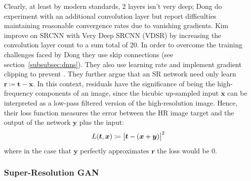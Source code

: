 Clearly, at least by modern standards, 2 layers isn't very deep; Dong \etal do experiment with an additional convolution layer but report difficulties maintaining reasonable convergence rates due to vanishing gradients.
%
Kim \etal \cite{Kim_2016} improve on SRCNN with Very Deep SRCNN (VDSR) by increasing the convolution layer count to a sum total of 20.
%
In order to overcome the training challenges faced by Dong \etal they use skip connections (see section~\ref{subsubsec:dnns}).
%
They also use learning rate  and implement gradient clipping to prevent .
%
They further argue that an SR network need only learn  \(\bm{r} \coloneqq \bm{t} - \bm{x}\).
%
In this context, residuals have the significance of being the high-frequency components of an image, since the bicubic up-sampled input \(\bm{x}\) can be interpreted as a low-pass filtered version of the high-resolution image.
%
Hence, their loss function measures the error between the HR image target and the output of the network \(\bm{y}\) plus the input:
\begin{equation}
    L(\bm{t}, \bm{x}) \coloneqq \abs{\bm{t} - (\bm{x} + \bm{y})}^2
\end{equation}
where in the case that \(\bm{y}\) perfectly approximates \(\bm{r}\) the loss would be 0.




\subsubsection{Super-Resolution GAN}\label{subsubsec:srgan}




